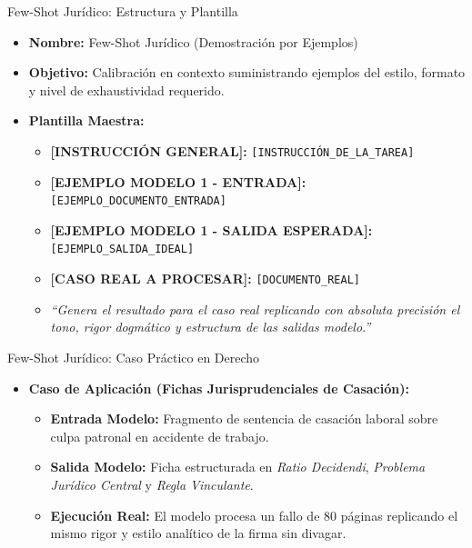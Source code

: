 \documentclass[aspectratio=169]{beamer}
\begin{document}
\begin{frame}{Few-Shot Jurídico: Estructura y Plantilla}


\begin{itemize}
  \item \textbf{Nombre:} Few-Shot Jurídico (Demostración por Ejemplos)
  \item \textbf{Objetivo:} Calibración en contexto suministrando ejemplos del estilo, formato y nivel de exhaustividad requerido.
  \item \textbf{Plantilla Maestra:}
  \begin{itemize}
    \item \textbf{[INSTRUCCIÓN GENERAL]:} \texttt{[INSTRUCCIÓN\_DE\_LA\_TAREA]}
    \item \textbf{[EJEMPLO MODELO 1 - ENTRADA]:} \texttt{[EJEMPLO\_DOCUMENTO\_ENTRADA]}
    \item \textbf{[EJEMPLO MODELO 1 - SALIDA ESPERADA]:} \texttt{[EJEMPLO\_SALIDA\_IDEAL]}
    \item \textbf{[CASO REAL A PROCESAR]:} \texttt{[DOCUMENTO\_REAL]}
    \item \textit{``Genera el resultado para el caso real replicando con absoluta precisión el tono, rigor dogmático y estructura de las salidas modelo.''}
  \end{itemize}
\end{itemize}
\end{frame}

\begin{frame}{Few-Shot Jurídico: Caso Práctico en Derecho}


\begin{itemize}
  \item \textbf{Caso de Aplicación (Fichas Jurisprudenciales de Casación):}
  \begin{itemize}
    \item \textbf{Entrada Modelo:} Fragmento de sentencia de casación laboral sobre culpa patronal en accidente de trabajo.
    \item \textbf{Salida Modelo:} Ficha estructurada en \textit{Ratio Decidendi}, \textit{Problema Jurídico Central} y \textit{Regla Vinculante}.
    \item \textbf{Ejecución Real:} El modelo procesa un fallo de 80 páginas replicando el mismo rigor y estilo analítico de la firma sin divagar.
  \end{itemize}
\end{itemize}
\end{frame}
\end{document}
